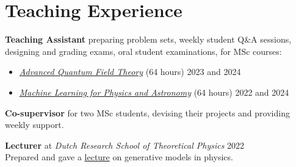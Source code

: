\documentclass[11pt, letterpaper]{article}
\newcommand{\dateright}[1]{\hfill{\small\color{accentblue} #1}}
\begin{document}
\section*{Teaching Experience}
\noindent
\textbf{Teaching Assistant} preparing problem sets, weekly student Q\&A sessions, designing and grading exams, oral student examinations, for MSc courses:
\begin{itemize}
    \item \href{https://coursecatalogue.uva.nl/xmlpages/page/2023-2024-en/search-course/course/109196}{\textit{Advanced Quantum Field Theory}} (64 hours) \dateright{2023 and 2024}
    \item \href{https://coursecatalogue.uva.nl/xmlpages/page/2022-2023-en/search-course/course/99394}{\textit{Machine Learning for Physics and Astronomy}} (64 hours) \dateright{2022 and 2024}
\end{itemize}

\vspace{0.2cm}
\noindent
\textbf{Co-supervisor} for two MSc students, devising their projects and providing weekly support.

\vspace{0.2cm}
\noindent
\textbf{Lecturer} at \textit{Dutch Research School of Theoretical Physics} \dateright{2022} \\
Prepared and gave a \href{https://www.drstp.nl/wp-content/uploads/2022/06/THEP-Schedule-2022.pdf}{lecture} on generative models in physics.
\end{document}
